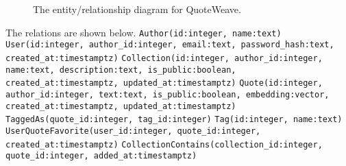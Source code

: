 \documentclass{article}
\begin{document}
\begin{figure}
  \caption{The entity/relationship diagram for QuoteWeave.\label{fig:er}}
\end{figure}
The relations are shown below.
\texttt{Author(id:integer, name:text)}
\texttt{User(id:integer, author\_id:integer, email:text, password\_hash:text, created\_at:timestamptz)}
\texttt{Collection(id:integer, author\_id:integer, name:text, description:text, is\_public:boolean, created\_at:timestamptz, updated\_at:timestamptz)}
\texttt{Quote(id:integer, author\_id:integer, text:text, is\_public:boolean, embedding:vector, created\_at:timestamptz, updated\_at:timestamptz)}
\texttt{TaggedAs(quote\_id:integer, tag\_id:integer)}
\texttt{Tag(id:integer, name:text)}
\texttt{UserQuoteFavorite(user\_id:integer, quote\_id:integer, created\_at:timestamptz)}
\texttt{CollectionContains(collection\_id:integer, quote\_id:integer, added\_at:timestamptz)}
\end{document}
